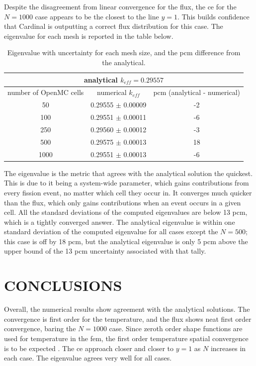\documentclass[letterpaper]{mc2023}
\begin{document}
Despite the disagreement from linear convergence for the flux, the \gls{ce} for the $N=1000$ case appears to be the closest to the line $y=1$. This
builds confidence that Cardinal is outputting a correct flux distribution for this case. The eigenvalue for each mesh is reported in the table below.
\begin{table}[H]
    \centering
    \caption{Eigenvalue with uncertainty for each mesh size, and the pcm difference from the analytical.}
    \begin{tabular}{@{}ccc@{}}
        \toprule
        \multicolumn{3}{c}{analytical $k_{eff}=0.29557$} \\
        \midrule
        number of OpenMC cells & numerical $k_{eff}$ & pcm (analytical - numerical)\\
        \midrule
        50 & 0.29555 $\pm$ 0.00009 & -2 \\
        100 & 0.29551 $\pm$ 0.00011 & -6 \\
        250 & 0.29560  $\pm$ 0.00012 &  -3 \\
        500 & 0.29575 $\pm$ 0.00013 & 18 \\
        1000 & 0.29551 $\pm$ 0.00013 & -6 \\
        \bottomrule
    \end{tabular}
    \label{tab:data}
\end{table}
The eigenvalue is the metric that agrees with the analytical solution the quickest. This is due to it being a system-wide parameter, which gains
contributions from every fission event, no matter which cell they occur in. It converges much quicker than the flux, which only gains contributions
when an event occurs in a given cell. All the standard deviations of the computed eigenvalues are below 13 pcm, which is a tightly converged answer.
The analytical eigenvalue is within one standard deviation of the computed eigenvalue for all cases except the $N=500$; this case is off by 18 pcm,
but the analytical eigenvalue is only 5 pcm above the upper bound of the 13 pcm uncertainty associated with that tally.

\section{CONCLUSIONS}\label{sec:conclusions}

Overall, the numerical results show agreement with the analytical solutions. The convergence is first order for the temperature, and the flux shows
neat first order convergence, baring the $N=1000$ case. Since zeroth order shape functions are used for temperature in the \gls{fem}, the first order
temperature spatial convergence is to be expected \cite{moose-convergence}. The \gls{ce} approach closer and closer to $y=1$ as $N$ increases in
each case. The eigenvalue agrees very well for all cases.
\end{document}
